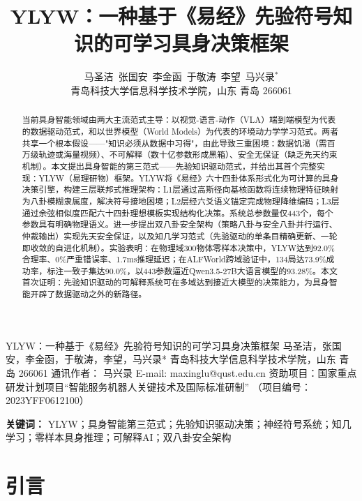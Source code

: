 \documentclass[12pt,a4paper]{article}
\title{YLYW：一种基于《易经》先验符号知识的可学习具身决策框架}
\author{马圣洁\  张国安\  李金函\  于敬涛\  李望\  马兴录$^*$\\
\footnotesize 青岛科技大学信息科学技术学院，山东 青岛 266061}
\date{}
\begin{document}
\maketitle

YLYW：一种基于《易经》先验符号知识的可学习具身决策框架
马圣洁，张国安，李金函，于敬涛，李望，马兴录*
青岛科技大学信息科学技术学院，山东 青岛 266061
通讯作者： 马兴录 E-mail: maxinglu@qust.edu.cn
资助项目：国家重点研发计划项目“智能服务机器人关键技术及国际标准研制” （项目编号：
2023YFF0612100）
\begin{abstract}
当前具身智能领域由两大主流范式主导：以视觉-语言-动作（VLA）端到端模型为代表的数据驱动范式，和以世界模型（World Models）为代表的环境动力学学习范式。两者共享一个根本假设——"知识必须从数据中习得"，由此导致三重困境：数据饥渴（需百万级轨迹或海量视频）、不可解释（数十亿参数形成黑箱）、安全无保证（缺乏先天约束机制）。本文提出具身智能的第三范式——先验知识驱动范式，并给出其首个完整实现：YLYW（易理研物）框架。YLYW将《易经》六十四卦体系形式化为可计算的具身决策引擎，构建三层联邦式推理架构：L1层通过高斯径向基核函数将连续物理特征映射为八卦模糊隶属度，解决符号接地困境；L2层经六爻语义锚定完成物理降维编码；L3层通过余弦相似度匹配六十四卦理想模板实现结构化决策。系统总参数量仅443个，每个参数具有明确物理语义。进一步提出双八卦安全架构（策略八卦与安全八卦并行运行、仲裁输出）实现先天安全保证，以及知几学习范式（先验驱动的单条目精确更新、一轮即收敛的自进化机制）。实验表明：在物理域300物体零样本决策中，YLYW达到92.0\%合理率、0\%严重错误率、1.7ms推理延迟；在ALFWorld跨域验证中，134局达73.9\%成功率，标注一致子集达90.0\%，以443参数逼近Qwen3.5-27B大语言模型的93.28\%。本文首次证明：先验知识驱动的可解释系统可在多域达到接近大模型的决策能力，为具身智能开辟了数据驱动之外的新路径。
\end{abstract}
\noindent\textbf{关键词：} YLYW；具身智能第三范式；先验知识驱动决策；神经符号系统；知几学习；零样本具身推理；可解释AI；双八卦安全架构
\section{引言}
\end{document}

